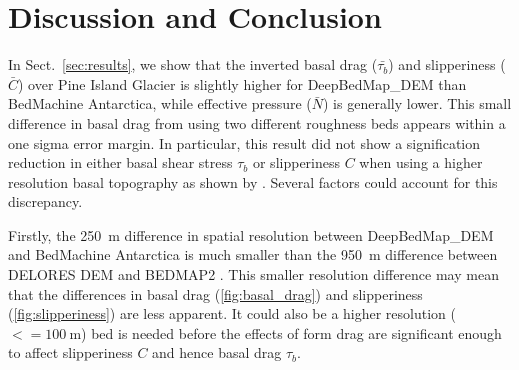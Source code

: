 \clearpage
\section{Discussion and Conclusion}

In Sect.~\ref{sec:results}, we show that the inverted basal drag ($\bar{\tau_b}$) and slipperiness ($\bar{C}$) over Pine Island Glacier is slightly higher for DeepBedMap\_DEM than BedMachine Antarctica, while effective pressure ($\bar{N}$) is generally lower.
This small difference in basal drag from using two different roughness beds appears within a one sigma error margin.
In particular, this result did not show a signification reduction in either basal shear stress $\tau_b$ or slipperiness $C$ when using a higher resolution basal topography as shown by \citet{Kyrke-SmithRelevanceDetailBasal2018}.
Several factors could account for this discrepancy.

Firstly, the \SI{250}{\metre} difference in spatial resolution between DeepBedMap\_DEM \citep{LeongDeepBedMap2020} and BedMachine Antarctica \citep{MorlighemMEaSUREsBedMachineAntarctica2020} is much smaller than the \SI{950}{\metre} difference between DELORES DEM \citep{BinghamDiverselandscapesPine2017} and BEDMAP2 \citep{FretwellBedmap2improvedice2013}.
This smaller resolution difference may mean that the differences in basal drag (\ref{fig:basal_drag}) and slipperiness (\ref{fig:slipperiness}) are less apparent.
It could also be a higher resolution ($<= \SI{100}{\metre}$) bed is needed \citep[e.g.][]{Grahamhighresolutionsyntheticbed2017} before the effects of form drag are significant enough to affect slipperiness $C$ and hence basal drag $\tau_b$.

